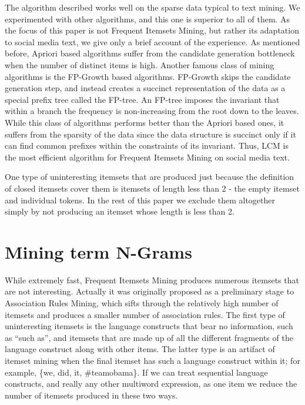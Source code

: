 \documentclass{sig-alternate}
\begin{document}
The algorithm described works well on the sparse data typical to text mining. We experimented with other algorithms, and this one is superior to all of them. As the focus of this paper is not Frequent Itemsets Mining, but rather its adaptation to social media text, we give only a brief account of the experience. As mentioned before, Apriori based algorithms suffer from the candidate generation bottleneck when the number of distinct items is high. Another famous class of mining algorithms is the FP-Growth \cite{han} based algorithms. FP-Growth  skips the candidate generation step, and instead creates a succinct representation of the data as a special prefix tree called the FP-tree. An FP-tree imposes the invariant that within a branch the frequency is non-increasing from the root down to the leaves. While this class of algorithms performs better than the Apriori based ones, it suffers from the sparsity of the data since the data structure is succinct only if it can find common prefixes within the constraints of its invariant. Thus, LCM is the most efficient algorithm for Frequent Itemsets Mining on social media text. 

One type of uninteresting itemsets that are produced just because the definition of closed itemsets cover them is itemsets of length less than 2 - the empty itemset and individual tokens. In the rest of this paper we exclude them altogether simply by not producing an itemset whose length is less than 2.

\section{Mining term N-Grams}
While extremely fast, Frequent Itemsets Mining produces numerous itemsets that are not interesting. Actually it was originally proposed as a preliminary stage to Association Rules Mining, which sifts through the relatively high number of itemsets and produces a smaller number of association rules. The first type of uninteresting itemsets is the language constructs that bear no information, such as ``such as'', and itemsets that are made up of all the different fragments of the language construct along with other items. The latter type is an artifact of itemset mining when the final itemset has such a language construct within it; for example, \{we, did, it, \#teamobama\}.
If we can treat sequential language constructs, and really any other multiword expression, as one item we reduce the number of itemsets produced in these two ways. %
\end{document}
